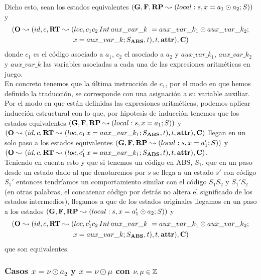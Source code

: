 Dicho esto, sean los estados equivalentes $(\mathbf{G}, \mathbf{F}, \textbf{RP} \leadsto (local:s,x = a_1 \odot a_2\mbox{;\,}S))$ y
\begin{multline*}
  (\mathbf{O} \leadsto (id, c, \textbf{RT} \leadsto (loc, c_1 c_2 \,Int\,aux\_var\_k\ = aux\_var\_k_1 \odot aux\_var\_k_2 \mbox{;\,}\\
  x = aux\_var\_k\mbox{;\,} S_{\textbf{ABS}}, t), t, \textbf{attr}), \mathbf{C})
\end{multline*}
donde $c_1$ es el código asociado a $a_1$, $c_2$ el asociado a $a_2$ y $aux\_var\_k_1$, $aux\_var\_k_2$ y $aux\_var\_k$ las variables asociadas a cada una de las expresiones aritméticas en juego.\\

En concreto tenemos que la última instrucción de $c_1$, por el modo en que hemos definido la traducción, se corresponde con una asignación a su variable auxiliar. Por el modo en que están definidas las expresiones aritméticas, podemos aplicar inducción estructural con lo que, por hipotesis de inducción tenemos que los estados equivalentes $(\mathbf{G}, \mathbf{F}, \textbf{RP} \leadsto (local:s,x = a_1\mbox{;\,}S))$ y $(\mathbf{O} \leadsto (id, c, \textbf{RT} \leadsto (loc, c_1\,x = aux\_var\_k_1\mbox{;\,} S_{\textbf{ABS}}, t), t, \textbf{attr}), \mathbf{C})$ llegan en un solo paso a los estados equivalentes $(\mathbf{G}, \mathbf{F}, \textbf{RP} \leadsto (local:s,x = a_1'\mbox{;\,}S))$ y $(\mathbf{O} \leadsto (id, c, \textbf{RT} \leadsto (loc, c_1'\,x = aux\_var\_k_1\mbox{;\,} S_{\textbf{ABS}}, t), t, \textbf{attr}), \mathbf{C})$.\\

Teniendo en cuenta esto y que si tenemos un código en ABS, $S_1$, que en un paso desde un estado dado al que denotaremos por $s$ se llega a un estado $s'$ con código $S_1'$ entonces tendríamos un comportamiento similar con el código $S_1 S_2$ y $S_1' S_2$ (en otras palabras, el concatenar código por detrás no altera el significado de los estados intermedios), llegamos a que de los estados originales llegamos en un paso a los estados $(\mathbf{G}, \mathbf{F}, \textbf{RP} \leadsto (local:s,x = a_1' \odot a_2\mbox{;\,}S))$ y
\begin{multline*}
  (\mathbf{O} \leadsto (id, c, \textbf{RT} \leadsto (loc, c_1' c_2 \,Int\,aux\_var\_k\ = aux\_var\_k_1 \odot aux\_var\_k_2 \mbox{;\,}\\
  x = aux\_var\_k\mbox{;\,} S_{\textbf{ABS}}, t), t, \textbf{attr}), \mathbf{C})
\end{multline*}
que son equivalentes.

\subsubsection{Casos $x = \nu \odot a_2$ y $x = \nu \odot \mu$ con $\nu, \mu \in \mathbb{Z}$}

